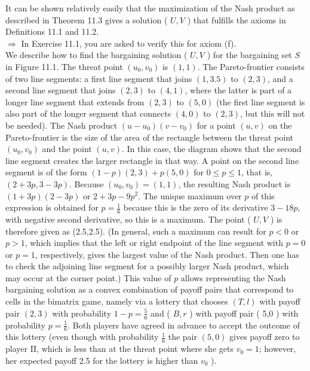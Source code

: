 \documentclass[12pt]{article}
\begin{document}
It can be shown relatively easily that the maximization of the Nash product as described in Theorem 11.3 gives a solution ( $U, V$ ) that fulfills the axioms in Definitions 11.1 and 11.2.\\
$\Rightarrow$ In Exercise 11.1, you are asked to verify this for axiom (f).\\
We describe how to find the bargaining solution ( $U, V$ ) for the bargaining set $S$ in Figure 11.1. The threat point $\left(u_{0}, v_{0}\right)$ is $(1,1)$. The Pareto-frontier consists of two line segments: a first line segment that joins $(1,3.5)$ to $(2,3)$, and a second line segment that joins $(2,3)$ to $(4,1)$, where the latter is part of a longer line segment that extends from $(2,3)$ to $(5,0)$ (the first line segment is also part of the longer segment that connects $(4,0)$ to $(2,3)$, but this will not be needed). The Nash product $\left(u-u_{0}\right)\left(v-v_{0}\right)$ for a point $(u, v)$ on the Pareto-frontier is the size of the area of the rectangle between the threat point $\left(u_{0}, v_{0}\right)$ and the point $(u, v)$. In this case, the diagram shows that the second line segment creates the larger rectangle in that way. A point on the second line segment is of the form $(1-p)(2,3)+p(5,0)$ for $0 \leq p \leq 1$, that is, $(2+3 p, 3-3 p)$. Because $\left(u_{0}, v_{0}\right)=(1,1)$, the resulting Nash product is $(1+3 p)(2-3 p)$ or $2+3 p-9 p^{2}$. The unique maximum over $p$ of this expression is obtained for $p=\frac{1}{6}$ because this is the zero of its derivative $3-18 p$, with negative second derivative, so this is a maximum. The point ( $U, V$ ) is therefore given as (2.5,2.5). (In general, such a maximum can result for $p<0$ or $p>1$, which implies that the left or right endpoint of the line segment with $p=0$\\
or $p=1$, respectively, gives the largest value of the Nash product. Then one has to check the adjoining line segment for a possibly larger Nash product, which may occur at the corner point.) This value of $p$ allows representing the Nash bargaining solution as a convex combination of payoff pairs that correspond to cells in the bimatrix game, namely via a lottery that chooses $(T, l)$ with payoff pair $(2,3)$ with probability $1-p=\frac{5}{6}$ and ( $B, r$ ) with payoff pair ( 5,0 ) with probability $p=\frac{1}{6}$. Both players have agreed in advance to accept the outcome of this lottery (even though with probability $\frac{1}{6}$ the pair $(5,0)$ gives payoff zero to player II, which is less than at the threat point where she gets $v_{0}=1$; however, her expected payoff 2.5 for the lottery is higher than $v_{0}$ ).
\end{document}
